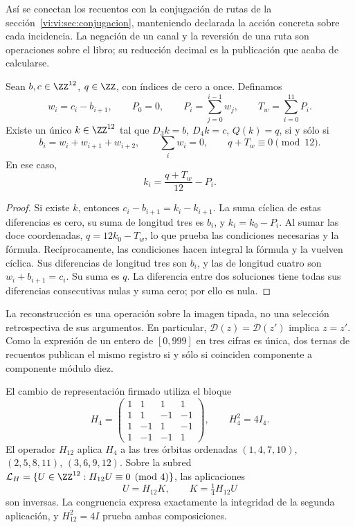 Así se conectan los recuentos con la conjugación de rutas de la
sección~\ref{vi:vi:sec:conjugacion}, manteniendo declarada la acción
concreta sobre cada incidencia. La negación de un canal y la reversión
de una ruta son operaciones sobre el libro; su reducción decimal es la
publicación que acaba de calcularse.

\begin{proposition}
\label{vi:vi:dep:imagen-integral}
Sean \(b,c\in\ZZ^{12}\), \(q\in\ZZ\), con índices de cero a once.
Definamos
\[
 w_i=c_i-b_{i+1},\qquad P_0=0,\qquad
 P_i=\sum_{j=0}^{i-1}w_j,\qquad T_w=\sum_{i=0}^{11}P_i.
\]
Existe un único \(k\in\ZZ^{12}\) tal que
\(D_3k=b\), \(D_4k=c\), \(Q(k)=q\), si y sólo si
\begin{equation}
 b_i=w_i+w_{i+1}+w_{i+2},\qquad
 \sum_iw_i=0,\qquad q+T_w\equiv0\pmod{12}.
 \label{vi:vi:dep:condiciones-imagen}
\end{equation}
En ese caso,
\begin{equation}
 k_i=\frac{q+T_w}{12}-P_i.
 \label{vi:vi:dep:inversa-incidencial}
\end{equation}
\end{proposition}
\begin{proof}
Si existe \(k\), entonces
\(c_i-b_{i+1}=k_i-k_{i+1}\). La suma cíclica de estas diferencias
es cero, su suma de longitud tres es \(b_i\), y
\(k_i=k_0-P_i\). Al sumar las doce coordenadas,
\(q=12k_0-T_w\), lo que prueba las condiciones necesarias y la fórmula.
Recíprocamente, las condiciones hacen integral la fórmula y la vuelven
cíclica. Sus diferencias de longitud tres son \(b_i\), y las de
longitud cuatro son \(w_i+b_{i+1}=c_i\). Su suma es \(q\).
La diferencia entre dos soluciones tiene todas sus diferencias
consecutivas nulas y suma cero; por ello es nula.
\end{proof}

La reconstrucción es una operación sobre la imagen tipada, no una
selección retrospectiva de sus argumentos. En particular,
\(\mathcal D(z)=\mathcal D(z')\) implica \(z=z'\).
Como la expresión de un entero de \([0,999]\) en tres cifras es única,
dos ternas de recuentos publican el mismo registro si y sólo si coinciden
componente a componente módulo diez.

El cambio de representación firmado utiliza el bloque
\begin{equation}
 H_4=\begin{pmatrix}
 1&1&1&1\\1&1&-1&-1\\
 1&-1&1&-1\\1&-1&-1&1
 \end{pmatrix},\qquad H_4^2=4I_4.
 \label{vi:vi:dep:hadamard}
\end{equation}
El operador \(H_{12}\) aplica \(H_4\) a las tres órbitas ordenadas
\((1,4,7,10)\), \((2,5,8,11)\), \((3,6,9,12)\).
Sobre la subred
\(\mathcal L_H=\{U\in\ZZ^{12}:H_{12}U\equiv0\pmod4\}\),
las aplicaciones
\begin{equation}
 U=H_{12}K,\qquad K=\tfrac14H_{12}U
 \label{vi:vi:dep:K-reversible}
\end{equation}
son inversas. La congruencia expresa exactamente la integridad de la
segunda aplicación, y \(H_{12}^2=4I\) prueba ambas composiciones.

